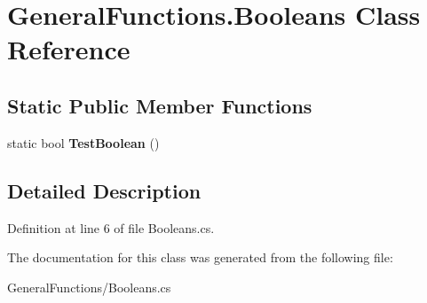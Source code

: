 \hypertarget{class_general_functions_1_1_booleans}{}\section{General\+Functions.\+Booleans Class Reference}
\label{class_general_functions_1_1_booleans}
\subsection*{Static Public Member Functions}
\begin{DoxyCompactItemize}
\item 
\hypertarget{class_general_functions_1_1_booleans_a6926d9348a1024cff5d607504f260edd}{}\label{class_general_functions_1_1_booleans_a6926d9348a1024cff5d607504f260edd} 
static bool {\bfseries Test\+Boolean} ()
\end{DoxyCompactItemize}


\subsection{Detailed Description}


Definition at line 6 of file Booleans.\+cs.



The documentation for this class was generated from the following file\+:\begin{DoxyCompactItemize}
\item 
General\+Functions/Booleans.\+cs\end{DoxyCompactItemize}
